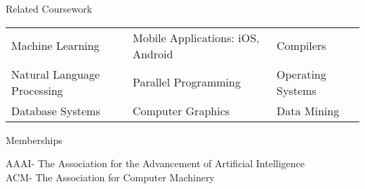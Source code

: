 \documentclass{resume}
\begin{document}

\begin{rSection}{Related Coursework}
\begin{tabularx}{\textwidth}{ X X X }
Machine Learning & Mobile Applications: iOS, Android & Compilers \\
Natural Language Processing & Parallel Programming & Operating Systems \\
Database Systems & Computer Graphics & Data Mining \\
\end{tabularx}

\end{rSection}


\begin{rSection}{Memberships}

AAAI- The Association for the Advancement of Artificial Intelligence \\
ACM- The Association for Computer Machinery

\end{rSection}
\end{document}

